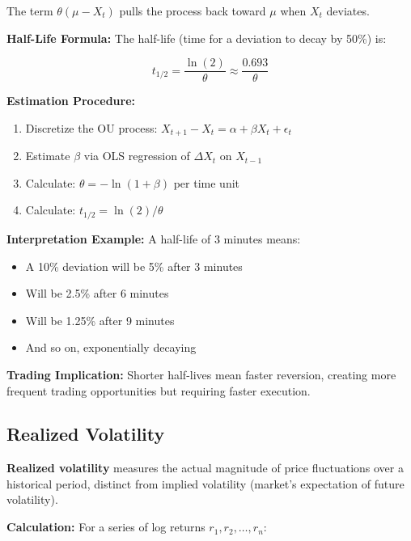 The term $\theta(\mu - X_t)$ pulls the process back toward $\mu$ when $X_t$ deviates.

\textbf{Half-Life Formula:} The half-life (time for a deviation to decay by 50\%) is:

\begin{equation}
t_{1/2} = \frac{\ln(2)}{\theta} \approx \frac{0.693}{\theta}
\end{equation}

\textbf{Estimation Procedure:}
\begin{enumerate}
    \item Discretize the OU process: $X_{t+1} - X_t = \alpha + \beta X_t + \epsilon_t$
    \item Estimate $\beta$ via OLS regression of $\Delta X_t$ on $X_{t-1}$
    \item Calculate: $\theta = -\ln(1 + \beta)$ per time unit
    \item Calculate: $t_{1/2} = \ln(2) / \theta$
\end{enumerate}

\textbf{Interpretation Example:} A half-life of 3 minutes means:
\begin{itemize}
    \item A 10\% deviation will be 5\% after 3 minutes
    \item Will be 2.5\% after 6 minutes
    \item Will be 1.25\% after 9 minutes
    \item And so on, exponentially decaying
\end{itemize}

\textbf{Trading Implication:} Shorter half-lives mean faster reversion, creating more frequent trading opportunities but requiring faster execution.

\subsection{Realized Volatility}
\label{method:volatility-appendix}

\textbf{Realized volatility} measures the actual magnitude of price fluctuations over a historical period, distinct from implied volatility (market's expectation of future volatility).

\textbf{Calculation:} For a series of log returns $r_1, r_2, \ldots, r_n$:

